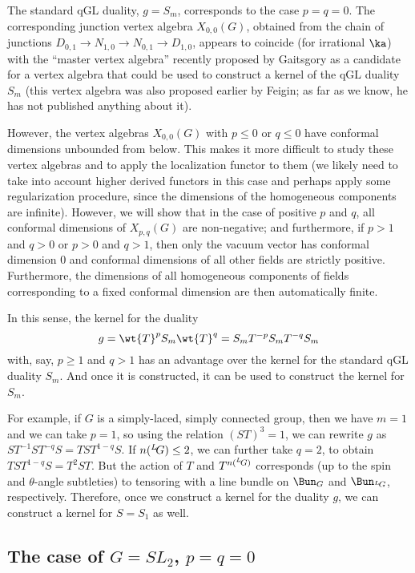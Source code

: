 \documentclass[11pt,reqno]{amsart}
\theoremstyle{plain}
\numberwithin{equation}{section}
\def\neg{\negthinspace}
\def\LG{{}^L\neg G}
\theoremstyle{definition}
\begin{document}
The standard qGL duality, $g=S_m$, corresponds to the case
$p=q=0$. The corresponding junction vertex algebra $X_{0,0}(G)$,
obtained from the chain of junctions $D_{0,1} \to N_{1,0} \to N_{0,1}
\to D_{1,0}$, appears to coincide (for irrational $\ka$) with the
``master vertex algebra'' recently proposed by Gaitsgory
\cite{Ga:Perimeter} as a candidate for a vertex algebra that could be
used to construct a kernel of the qGL duality $S_m$ (this vertex
algebra was also proposed earlier by Feigin; as far as we know, he has
not published anything about it).

However, the vertex algebras $X_{0,0}(G)$ with $p\leq 0$ or $q \leq 0$
have conformal dimensions unbounded from below. This makes it more
difficult to study these vertex algebras and to apply the localization
functor to them (we likely need to take into account higher derived
functors in this case and perhaps apply some regularization procedure,
since the dimensions of the homogeneous components are
infinite). However, we will show that in the case of positive $p$ and
$q$, all conformal dimensions of $X_{p,q}(G)$ are non-negative; and
furthermore, if $p>1$ and $q>0$ or $p>0$ and $q>1$, then only
the vacuum vector has conformal dimension $0$ and conformal dimensions
of all other fields are strictly positive. Furthermore, the dimensions
of all homogeneous components of fields corresponding to a fixed
conformal dimension are then automatically finite.

In this sense, the kernel for the duality
$$
g = \wt{T}^{p} S_m \wt{T}^q = S_m T^{-p} S_m T^{-q} S_m
$$
with, say, $p \geq 1$ and $q>1$ has an advantage over the kernel for
the standard qGL duality $S_m$. And once it is constructed, it can be
used to construct the kernel for $S_m$.

For example, if $G$ is a simply-laced, simply connected group, then we
have $m=1$ and we can take $p=1$, so using the relation $(ST)^3=1$, we
can rewrite $g$ as $S T^{-1} S T^{-q} S = T S T^{1-q} S$. If
$n(\LG)\leq 2$, we can further take $q=2$, to obtain $T S T^{1-q} S =
T^2ST$. But the action of $T$ and $T^{n(\LG)}$ corresponds (up to the
spin and $\theta$-angle subtleties) to tensoring with a line bundle on
$\Bun_G$ and $\Bun_{\LG}$, respectively. Therefore, once we construct
a kernel for the duality $g$, we can construct a kernel for $S=S_1$ as
well.

\subsection{The case of $G=SL_2$, $p=q=0$}
\end{document}
